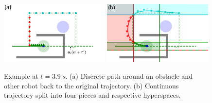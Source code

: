 \documentclass{svproc}
\begin{document}
\begin{figure}
\centering
\includegraphics[width=0.49\textwidth]{images/swap2_discrete.pdf}
\hfill
\includegraphics[width=0.49\textwidth]{images/swap2_cont_red.pdf}
\caption{
Example at $t=\SI{3.9}{s}$.
(a) Discrete path around an obstacle and other robot back to the original trajectory.
(b) Continuous trajectory split into four pieces and respective hyperspaces.
}
\label{fig:swap2_2}
\end{figure}

\end{document}
